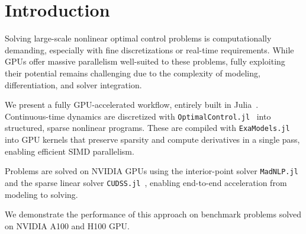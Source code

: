 


\section{Introduction}

Solving large-scale nonlinear optimal control problems is computationally demanding, especially with fine discretizations or real-time requirements.  
While GPUs offer massive parallelism well-suited to these problems, fully exploiting their potential remains challenging due to the complexity of modeling, differentiation, and solver integration.

We present a fully GPU-accelerated workflow, entirely built in Julia~\cite{bezanson2017julia}.
Continuous-time dynamics are discretized with \texttt{OptimalControl.jl}~\cite{Caillau_OptimalControl_jl_a_Julia} into structured, sparse nonlinear programs.  
These are compiled with \texttt{ExaModels.jl}~\cite{shin2024accelerating} into GPU kernels that preserve sparsity and compute derivatives in a single pass, enabling efficient SIMD parallelism.

Problems are solved on NVIDIA GPUs using the interior-point solver \texttt{MadNLP.jl}~\cite{shin2021graph} and the sparse linear solver \texttt{CUDSS.jl}~\cite{Montoison_CUDSS_jl_Julia_interface}, enabling end-to-end acceleration from modeling to solving.

We demonstrate the performance of this approach on benchmark problems solved on NVIDIA A100 and H100 GPU.


